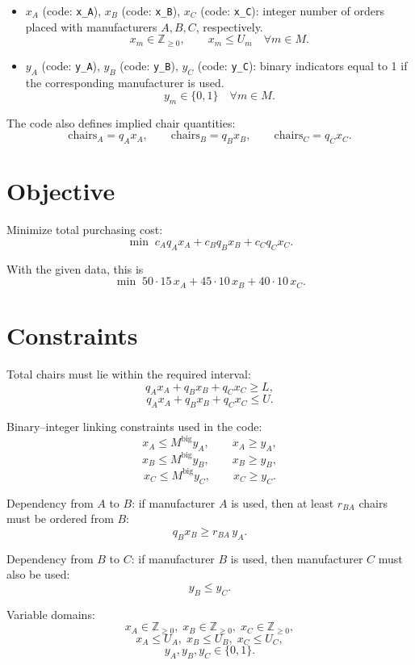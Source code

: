 \begin{itemize}
    \item \(x_A\) (code: \texttt{x\_A}), \(x_B\) (code: \texttt{x\_B}), \(x_C\) (code: \texttt{x\_C}): integer number of orders placed with manufacturers \(A,B,C\), respectively.
    \[
    x_m \in \mathbb{Z}_{\ge 0}, \qquad x_m \le U_m \quad \forall m \in M.
    \]
    \item \(y_A\) (code: \texttt{y\_A}), \(y_B\) (code: \texttt{y\_B}), \(y_C\) (code: \texttt{y\_C}): binary indicators equal to 1 if the corresponding manufacturer is used.
    \[
    y_m \in \{0,1\} \quad \forall m \in M.
    \]
\end{itemize}

The code also defines implied chair quantities:
\[
\text{chairs}_A = q_A x_A,\qquad \text{chairs}_B = q_B x_B,\qquad \text{chairs}_C = q_C x_C.
\]

\section*{Objective}

Minimize total purchasing cost:
\[
\min \; c_A q_A x_A + c_B q_B x_B + c_C q_C x_C.
\]

With the given data, this is
\[
\min \; 50\cdot 15\,x_A + 45\cdot 10\,x_B + 40\cdot 10\,x_C.
\]

\section*{Constraints}

Total chairs must lie within the required interval:
\[
q_A x_A + q_B x_B + q_C x_C \ge L,
\]
\[
q_A x_A + q_B x_B + q_C x_C \le U.
\]

Binary--integer linking constraints used in the code:
\[
x_A \le M^{\text{big}} y_A,\qquad x_A \ge y_A,
\]
\[
x_B \le M^{\text{big}} y_B,\qquad x_B \ge y_B,
\]
\[
x_C \le M^{\text{big}} y_C,\qquad x_C \ge y_C.
\]

Dependency from \(A\) to \(B\): if manufacturer \(A\) is used, then at least \(r_{BA}\) chairs must be ordered from \(B\):
\[
q_B x_B \ge r_{BA}\, y_A.
\]

Dependency from \(B\) to \(C\): if manufacturer \(B\) is used, then manufacturer \(C\) must also be used:
\[
y_B \le y_C.
\]

Variable domains:
\[
x_A \in \mathbb{Z}_{\ge 0},\; x_B \in \mathbb{Z}_{\ge 0},\; x_C \in \mathbb{Z}_{\ge 0},
\]
\[
x_A \le U_A,\; x_B \le U_B,\; x_C \le U_C,
\]
\[
y_A,y_B,y_C \in \{0,1\}.
\]


